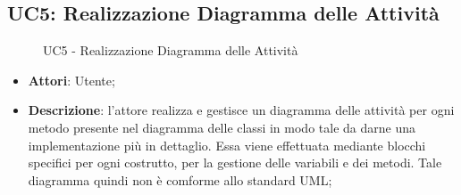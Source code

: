 \begin{itemize}
\begin{itemize}
\begin{itemize}
\begin{itemize}
\subsection{UC5: Realizzazione Diagramma delle Attività}
\label{UC5}
\begin{figure}[H]
	\caption{UC5 - Realizzazione Diagramma delle Attività}
\end{figure}
\begin{itemize}
	\item \textbf{Attori}: Utente;
	\item \textbf{Descrizione}: l'attore realizza e gestisce un diagramma delle attività per ogni metodo presente nel diagramma delle classi in modo tale da darne una implementazione più in dettaglio. Essa viene effettuata mediante blocchi specifici per ogni costrutto, per la gestione delle variabili e dei metodi. Tale diagramma quindi non è comforme allo standard UML;

\end{itemize}
\end{itemize}
\end{itemize}
\end{itemize}
\end{itemize}
